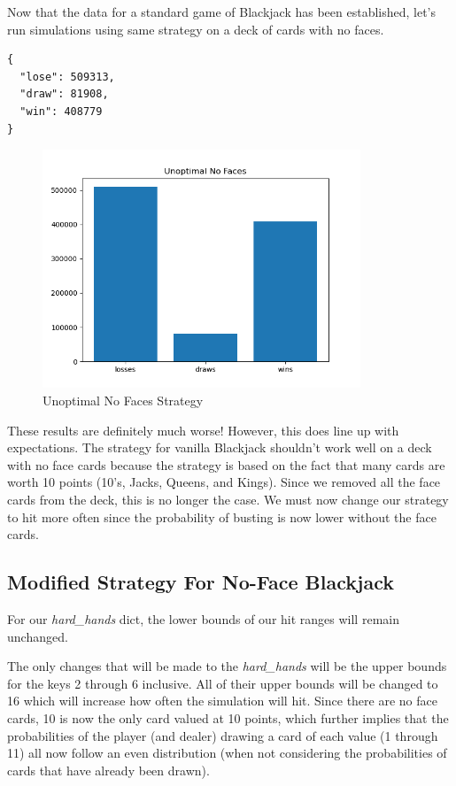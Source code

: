 \documentclass{article}
\begin{document}
{		Now that the data for a standard game of Blackjack has been established, let's run simulations using same strategy on a deck of cards 
		with no faces.

        \begin{verbatim}
{
  "lose": 509313,
  "draw": 81908,
  "win": 408779
}
        \end{verbatim}
        
		\begin{figure}[H]
			\hypertarget{fig3}{}
			\begin{center}
				\includegraphics[width=9.5cm]{unoptimal-no-faces.png}
			\end{center}
			\vspace{-10mm}
			\caption{Unoptimal No Faces Strategy}
		\end{figure}

		These results are definitely much worse! However, this does line up with expectations. The strategy for vanilla Blackjack shouldn't 
		work well on a deck with no face cards because the strategy is based on the fact that many cards are worth 10 points (10's, Jacks, 
		Queens, and Kings). Since we removed all the face cards from the deck, this is no longer the case. We must now change our strategy to 
		hit more often since the probability of busting is now lower without the face cards.
        
        \subsection{Modified Strategy For No-Face Blackjack}
		\label{Modified Strategy For No-Face Blackjack}
        
			For our \textit{hard\_hands} dict, the lower bounds of our hit ranges will remain unchanged. 

			The only changes that will be made to the \textit{hard\_hands} will be the upper bounds for the keys 2 through 6 inclusive.
			All of their upper bounds will be changed to 16 which will increase how often the simulation will hit. 
			Since there are no face cards, 10 is now the only card valued at 10 points,
			which further implies that the probabilities of the player (and dealer) drawing a card of each value (1 through 11) all now follow an even 
			distribution (when not considering the probabilities of cards that have already been drawn). 

}
\end{document}
